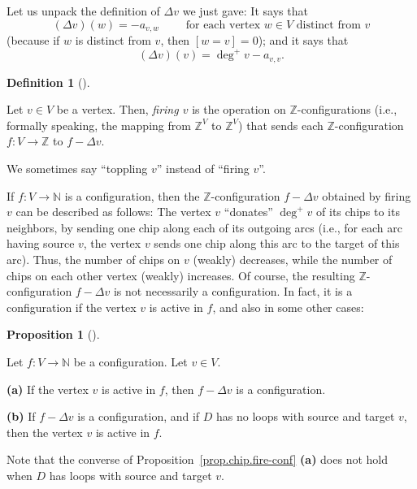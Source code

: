 \documentclass[numbers=enddot,12pt,final,onecolumn,notitlepage]{scrartcl}%
\theoremstyle{definition}
\newtheorem{prop}[theo]{Proposition}
\newenvironment{proposition}[1][]
{\begin{prop}[#1]\begin{leftbar}}
{\end{leftbar}\end{prop}}
\newtheorem{defi}[theo]{Definition}
\newenvironment{definition}[1][]
{\begin{defi}[#1]\begin{leftbar}}
{\end{leftbar}\end{defi}}
\newcommand{\NN}{\mathbb{N}}
\newcommand{\ZZ}{\mathbb{Z}}
\newcommand{\tup}[1]{\left( #1 \right)}
\newcommand{\ive}[1]{\left[ #1 \right]}
\begin{document}
Let us unpack the definition of $\Delta v$ we just gave:
It says that
\[
\tup{\Delta v} \tup{w} = - a_{v, w}
\qquad \text{ for each vertex } w \in V \text{ distinct from } v
\]
(because if $w$ is distinct
from $v$, then $\ive{w = v} = 0$);
and it says that
\[
\tup{\Delta v} \tup{v} = \deg^+ v - a_{v, v} .
\]

\begin{definition}
Let $v \in V$ be a vertex.
Then, \textit{firing $v$} is the operation on
$\ZZ$-configurations (i.e., formally speaking, the mapping from
$\ZZ^V$ to $\ZZ^V$) that sends each $\ZZ$-configuration
$f : V \to \ZZ$ to $f - \Delta v$.

We sometimes say ``toppling $v$'' instead of ``firing $v$''.
\end{definition}

If $f : V \to \NN$ is a configuration, then the
$\ZZ$-configuration $f - \Delta v$ obtained by firing $v$ can be
described as follows:
The vertex $v$ ``donates'' $\deg^+ v$ of its chips to its
neighbors, by sending one chip along each of its outgoing arcs
(i.e., for each arc having source $v$, the vertex $v$ sends one
chip along this arc to the target of this arc).
Thus, the number of chips on $v$ (weakly) decreases, while the
number of chips on each other vertex (weakly) increases.
Of course, the resulting $\ZZ$-configuration $f - \Delta v$ is
not necessarily a configuration.
In fact, it is a configuration if the vertex $v$ is
active in $f$,
and also in some other cases:

\begin{proposition} \label{prop.chip.fire-conf}
Let $f : V \to \NN$ be a configuration.
Let $v \in V$.

\textbf{(a)} If the vertex $v$ is active in $f$, then
$f - \Delta v$ is a configuration.

\textbf{(b)} If $f - \Delta v$ is a configuration, and if
$D$ has no loops with source and target $v$, then
the vertex $v$ is active in $f$.
\end{proposition}

Note that the converse of
Proposition~\ref{prop.chip.fire-conf} \textbf{(a)} does not
hold when $D$ has loops with source and target $v$.
\end{document}
